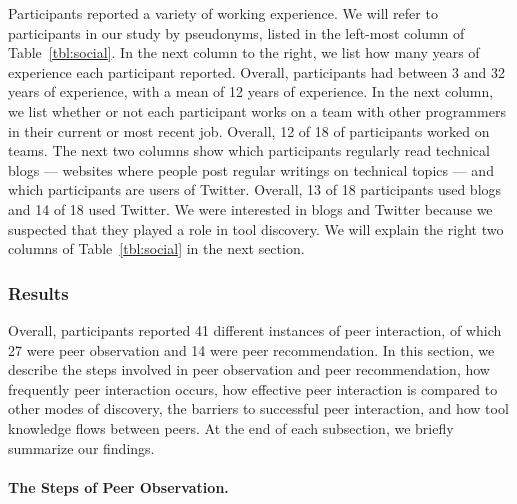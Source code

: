 \documentclass[smallextended]{svjour3}
\newcommand\discovery{peer interaction\xspace}
\newcommand\discpush{peer recommendation\xspace}
\newcommand\discpull{peer observation\xspace}
\newcommand\DiscPull{Peer Observation\xspace}
\begin{document}
\begin{table}[t]
\begin{tabularx}{100mm}{Xr|ccc|cc}
	\end{tabularx}


	
\end{table}
Participants reported a variety of working experience. 
We will refer to participants in our study by pseudonyms, listed in the left-most
column of Table~\ref{tbl:social}.
In the next column to the right, we list how many years of experience each
participant reported. 
Overall, participants had between 3 and 32 years of experience, with 
a mean of 12 years of experience.
In the next column, we list whether or not each participant works on a team with
other programmers in their current or most recent job.
Overall, 12 of 18 of participants worked on teams.
The next two columns show which participants regularly read technical blogs --- 
websites where people post regular writings on technical topics ---   
and which participants are users of Twitter.
Overall, 13 of 18 participants used blogs and 14 of 18 used Twitter. 
We were interested in blogs and Twitter
because we suspected that they played a role in tool discovery.
We will explain the right two columns of Table~\ref{tbl:social} in the next section.

\subsubsection{Results}\label{sec:interviewresults}

\noindent
Overall, participants reported 41 different instances of \discovery,
of which 27 were \discpull and 14 were \discpush.
In this section, we describe 
the steps involved in \discpull and \discpush,
how frequently \discovery occurs,
how effective \discovery is compared to other modes of discovery,
the barriers to successful \discovery,
and how tool knowledge flows between peers.
At the end of each subsection, we briefly summarize our findings.
	
\paragraph{The Steps of \DiscPull.}

\end{document}
